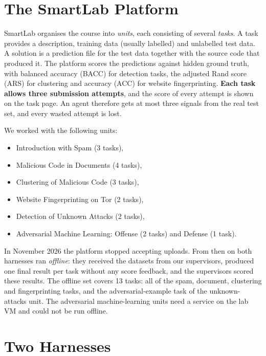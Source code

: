 \documentclass[letterpaper,twocolumn,10pt]{article}
\begin{document}
\section{The SmartLab Platform}

SmartLab organises the course into \emph{units}, each consisting of several
\emph{tasks}. A task provides a description, training data (usually
labelled) and unlabelled test data. A solution is a prediction file for the
test data together with the source code that produced it. The platform scores
the predictions against hidden ground truth, with balanced accuracy (BACC)
for detection tasks, the adjusted Rand score (ARS) for clustering and
accuracy (ACC) for website fingerprinting. \textbf{Each task allows three
submission attempts}, and the score of every attempt is shown on the task
page. An agent therefore gets at most three signals from the real test set,
and every wasted attempt is lost.

We worked with the following units:
\begin{itemize}
  \setlength{\itemsep}{0pt}
  \item Introduction with Spam (3 tasks),
  \item Malicious Code in Documents (4 tasks),
  \item Clustering of Malicious Code (3 tasks),
  \item Website Fingerprinting on Tor (2 tasks),
  \item Detection of Unknown Attacks (2 tasks),
  \item Adversarial Machine Learning: Offense (2 tasks) and Defense (1 task).
\end{itemize}

In November 2026 the platform stopped accepting uploads. From then on both
harnesses ran \emph{offline}: they received the datasets from our
supervisors, produced one final result per task without any score feedback,
and the supervisors scored these results. The offline set covers 13 tasks:
all of the spam, document, clustering and fingerprinting tasks, and the
adversarial-example task of the unknown-attacks unit. The adversarial
machine-learning units need a service on the lab VM and could not be run
offline.

\section{Two Harnesses}
\label{sec:approaches}
\end{document}
